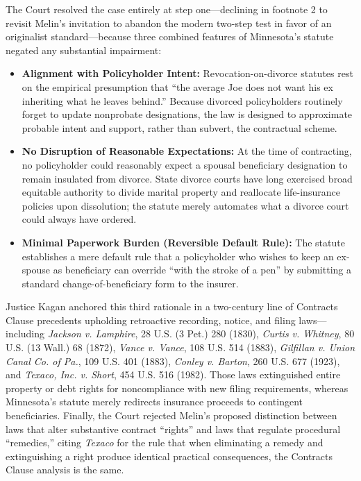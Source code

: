 \documentclass[12pt]{article}
\begin{document}
The Court resolved the case entirely at step one---declining in footnote 2 to revisit Melin's invitation to abandon the modern two-step test in favor of an originalist standard---because three combined features of Minnesota's statute negated any substantial impairment:
\begin{itemize}
  \item \textbf{Alignment with Policyholder Intent:} Revocation-on-divorce statutes rest on the empirical presumption that ``the average Joe does not want his ex inheriting what he leaves behind.'' Because divorced policyholders routinely forget to update nonprobate designations, the law is designed to approximate probable intent and support, rather than subvert, the contractual scheme.
  \item \textbf{No Disruption of Reasonable Expectations:} At the time of contracting, no policyholder could reasonably expect a spousal beneficiary designation to remain insulated from divorce. State divorce courts have long exercised broad equitable authority to divide marital property and reallocate life-insurance policies upon dissolution; the statute merely automates what a divorce court could always have ordered.
  \item \textbf{Minimal Paperwork Burden (Reversible Default Rule):} The statute establishes a mere default rule that a policyholder who wishes to keep an ex-spouse as beneficiary can override ``with the stroke of a pen'' by submitting a standard change-of-beneficiary form to the insurer.
\end{itemize}

Justice Kagan anchored this third rationale in a two-century line of Contracts Clause precedents upholding retroactive recording, notice, and filing laws---including \textit{Jackson v. Lamphire}, 28 U.S. (3 Pet.) 280 (1830), \textit{Curtis v. Whitney}, 80 U.S. (13 Wall.) 68 (1872), \textit{Vance v. Vance}, 108 U.S. 514 (1883), \textit{Gilfillan v. Union Canal Co. of Pa.}, 109 U.S. 401 (1883), \textit{Conley v. Barton}, 260 U.S. 677 (1923), and \textit{Texaco, Inc. v. Short}, 454 U.S. 516 (1982). Those laws extinguished entire property or debt rights for noncompliance with new filing requirements, whereas Minnesota's statute merely redirects insurance proceeds to contingent beneficiaries. Finally, the Court rejected Melin's proposed distinction between laws that alter substantive contract ``rights'' and laws that regulate procedural ``remedies,'' citing \textit{Texaco} for the rule that when eliminating a remedy and extinguishing a right produce identical practical consequences, the Contracts Clause analysis is the same.
\end{document}
